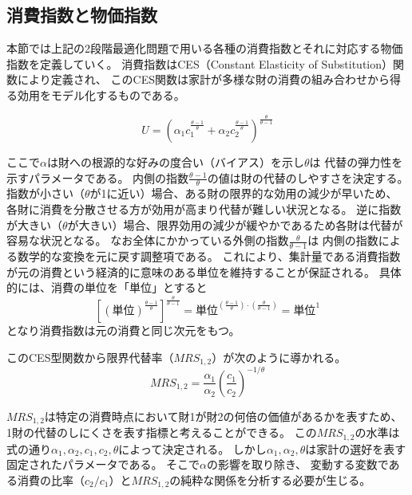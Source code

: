 \subsection{消費指数と物価指数}
\label{sec:model_households_indices}
本節では上記の2段階最適化問題で用いる各種の消費指数とそれに対応する物価指数を定義していく。
消費指数はCES（Constant Elasticity of Substitution）関数により定義され、
このCES関数は家計が多様な財の消費の組み合わせから得る効用をモデル化するものである。

\begin{equation}
\label{form:model_households_indices_ces_eq}
    U=\left(\alpha_1c_1^{\frac{\theta-1}{\theta}}+\alpha_2c_2^{\frac{\theta-1}{\theta}}\right)^{\frac{\theta}{\theta-1}}
\end{equation}

ここで\(\alpha\)は財への根源的な好みの度合い（バイアス）を示し\(\theta\)は
代替の弾力性を示すパラメータである。
内側の指数\(\frac{\theta-1}{\theta}\)の値は財の代替のしやすさを決定する。
指数が小さい（\(\theta\)が1に近い）場合、ある財の限界的な効用の減少が早いため、
各財に消費を分散させる方が効用が高まり代替が難しい状況となる。
逆に指数が大きい（\(\theta\)が大きい）場合、限界効用の減少が緩やかであるため各財は代替が容易な状況となる。
なお全体にかかっている外側の指数\(\frac{\theta}{\theta-1}\)は
内側の指数による数学的な変換を元に戻す調整項である。
これにより、集計量である消費指数が元の消費という経済的に意味のある単位を維持することが保証される。
具体的には、消費の単位を「単位」とすると
\begin{equation}
\label{form:model_households_indices_ces_units}
    \left[(\text{単位})^{\frac{\theta-1}{\theta}}\right]^{\frac{\theta}{\theta-1}}=\text{単位}^{(\frac{\theta-1}{\theta})\cdot(\frac{\theta}{\theta-1})}=\text{単位}^1
\end{equation}
となり消費指数は元の消費と同じ次元をもつ。

このCES型関数から限界代替率（\(MRS_{1,2}\)）が次のように導かれる。
\begin{equation}
\label{form:model_households_indices_mrs}
    MRS_{1,2}=\frac{\alpha_1}{\alpha_2}\left(\frac{c_1}{c_2}\right)^{-1/\theta}
\end{equation}

\(MRS_{1,2}\)は特定の消費時点において財1が財2の何倍の価値があるかを表すため、
1財の代替のしにくさを表す指標と考えることができる。
この\(MRS_{1,2}\)の水準は式の通り\(\alpha_1,\alpha_2,c_1,c_2,\theta\)によって決定される。
しかし\(\alpha_1,\alpha_2,\theta\)は家計の選好を表す固定されたパラメータである。
そこで\(\alpha\)の影響を取り除き、
変動する変数である消費の比率（\(c_2/c_1\)）と\(MRS_{1,2}\)の純粋な関係を分析する必要が生じる。

